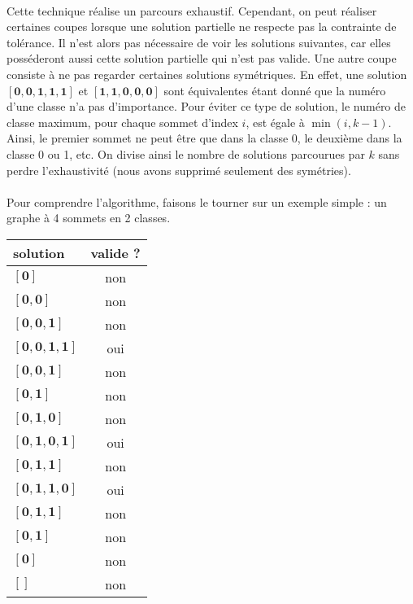 \documentclass[12pt]{article}
\begin{document}
\paragraph{}Cette technique réalise un parcours exhaustif. Cependant, on peut réaliser certaines coupes lorsque une solution partielle ne respecte pas la contrainte de tolérance. Il n'est alors pas nécessaire de voir les solutions suivantes, car elles posséderont aussi cette solution partielle qui n'est pas valide. Une autre coupe consiste à ne pas regarder certaines solutions symétriques. En effet, une solution $\mathbf{[0,0,1,1,1]}$ et $\mathbf{[1,1,0,0,0]}$ sont équivalentes étant donné que la numéro d'une classe n'a pas d'importance. Pour éviter ce type de solution, le numéro de classe maximum, pour chaque sommet d'index $i$, est égale à $\min\left(i,k-1\right)$. Ainsi, le premier sommet ne peut être que dans la classe 0, le deuxième dans la classe 0 ou 1, etc. On divise ainsi le nombre de solutions parcourues par $k$ sans perdre l'exhaustivité (nous avons supprimé seulement des symétries).

\paragraph{}Pour comprendre l'algorithme, faisons le tourner sur un exemple simple : un graphe à 4 sommets en 2 classes.

\begin{table}[h]
\centering
\begin{tabular}{|l|c|}
	\hline
	solution & valide ? \\
	\hline
	$\mathbf{[0]}$ & non \\
	$\mathbf{[0,0]}$ & non \\
	$\mathbf{[0,0,1]}$ & non \\
	$\mathbf{[0,0,1,1]}$ & oui \\
	$\mathbf{[0,0,1]}$ & non \\
	$\mathbf{[0,1]}$ & non \\
	$\mathbf{[0,1,0]}$ & non \\
	$\mathbf{[0,1,0,1]}$ & oui \\
	$\mathbf{[0,1,1]}$ & non \\
	$\mathbf{[0,1,1,0]}$ & oui \\
	$\mathbf{[0,1,1]}$ & non \\
	$\mathbf{[0,1]}$ & non \\
	$\mathbf{[0]}$ & non \\
	$\mathbf{[]}$ & non \\
	\hline
\end{tabular}
\end{table}
\end{document}
